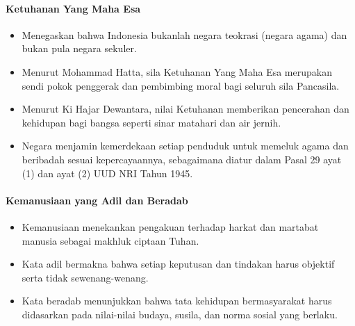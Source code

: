 \paragraph{Ketuhanan Yang Maha Esa}

\begin{itemize}
\item Menegaskan bahwa Indonesia bukanlah negara teokrasi (negara agama) dan bukan pula negara sekuler.
\item Menurut Mohammad Hatta, sila Ketuhanan Yang Maha Esa merupakan sendi pokok penggerak dan pembimbing moral bagi seluruh sila Pancasila.
\item Menurut Ki Hajar Dewantara, nilai Ketuhanan memberikan pencerahan dan kehidupan bagi bangsa seperti sinar matahari dan air jernih.
\item Negara menjamin kemerdekaan setiap penduduk untuk memeluk agama dan beribadah sesuai kepercayaannya, sebagaimana diatur dalam Pasal 29 ayat (1) dan ayat (2) UUD NRI Tahun 1945.
\end{itemize}

\paragraph{Kemanusiaan yang Adil dan Beradab}

\begin{itemize}
\item Kemanusiaan menekankan pengakuan terhadap harkat dan martabat manusia sebagai makhluk ciptaan Tuhan.
\item Kata adil bermakna bahwa setiap keputusan dan tindakan harus objektif serta tidak sewenang-wenang.
\item Kata beradab menunjukkan bahwa tata kehidupan bermasyarakat harus didasarkan pada nilai-nilai budaya, susila, dan norma sosial yang berlaku.
\end{itemize}
